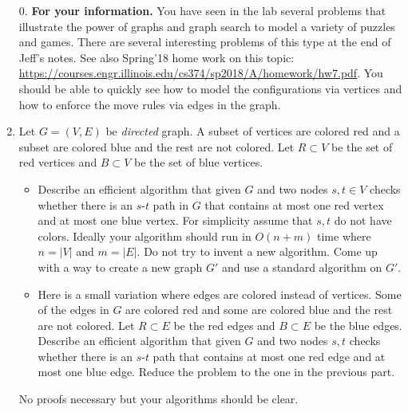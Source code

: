 \documentclass[11pt]{article}
\begin{document}
\begin{enumerate}


\item[0.] {\bf For your information.} You have seen in the lab several
  problems that illustrate the power of graphs and graph search to
  model a variety of puzzles and games. There are several interesting
  problems of this type at the end of Jeff's notes. See also Spring'18
  home work on this topic:
  \url{https://courses.engr.illinois.edu/cs374/sp2018/A/homework/hw7.pdf}.
  You should be able to quickly see how to model the configurations
  via vertices and how to enforce the move rules via edges in the
  graph.


\item Let $G=(V,E)$ be \emph{directed} graph. A subset of vertices are colored
  red and a subset are colored blue and the rest are not colored.  Let
  $R \subset V$ be the set of red vertices and $B \subset V$ be the set
  of blue vertices.
  \begin{itemize}
  \item Describe an efficient algorithm that given $G$ and
  two nodes $s,t \in V$ checks whether there is an $s$-$t$ path in $G$
  that contains at most one red vertex and at most one blue
  vertex. For simplicity assume that $s,t$ do not have colors. Ideally
  your algorithm should run in $O(n+m)$ time where $n = |V|$ and $m = |E|$.
  Do not try to invent a new algorithm. Come up with a way to create
  a new graph $G'$ and use a standard algorithm on $G'$.
\item Here is a small variation where edges are colored instead of
  vertices.  Some of the edges in $G$ are colored red and some are
  colored blue and the rest are not colored. Let $R \subset E$ be the
  red edges and $B \subset E$ be the blue edges. Describe an efficient
  algorithm that given $G$ and two nodes $s,t$ checks whether there is
  an $s$-$t$ path that contains at most one red edge and at most one
  blue edge. Reduce the problem to the one in the previous part.
  \end{itemize}

 No proofs necessary but your algorithms should be clear.




\end{enumerate}
\end{document}
